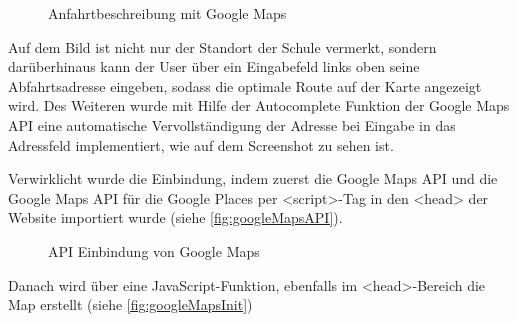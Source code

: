 \begin{figure}[!htbp]
	\caption{Anfahrtbeschreibung mit Google Maps}
	\label{fig:googleMaps}
\end{figure}

Auf dem Bild ist nicht nur der Standort der Schule vermerkt, sondern darüberhinaus kann der User über ein Eingabefeld links oben seine Abfahrtsadresse eingeben, sodass die optimale Route auf der Karte angezeigt wird. Des Weiteren wurde mit Hilfe der Autocomplete Funktion der Google Maps API eine automatische Vervollständigung der Adresse bei Eingabe in das Adressfeld implementiert, wie auf dem Screenshot zu sehen ist.
\par
Verwirklicht wurde die Einbindung, indem zuerst die Google Maps API und die Google Maps API für die Google Places per <script>-Tag in den <head> der Website importiert wurde (siehe \vref{fig:googleMapsAPI}).

\begin{figure}[!htbp]
	\caption{API Einbindung von Google Maps}
	\label{fig:googleMapsAPI}
\end{figure}

Danach wird über eine JavaScript-Funktion, ebenfalls im <head>-Bereich die Map erstellt (siehe \vref{fig:googleMapsInit})

